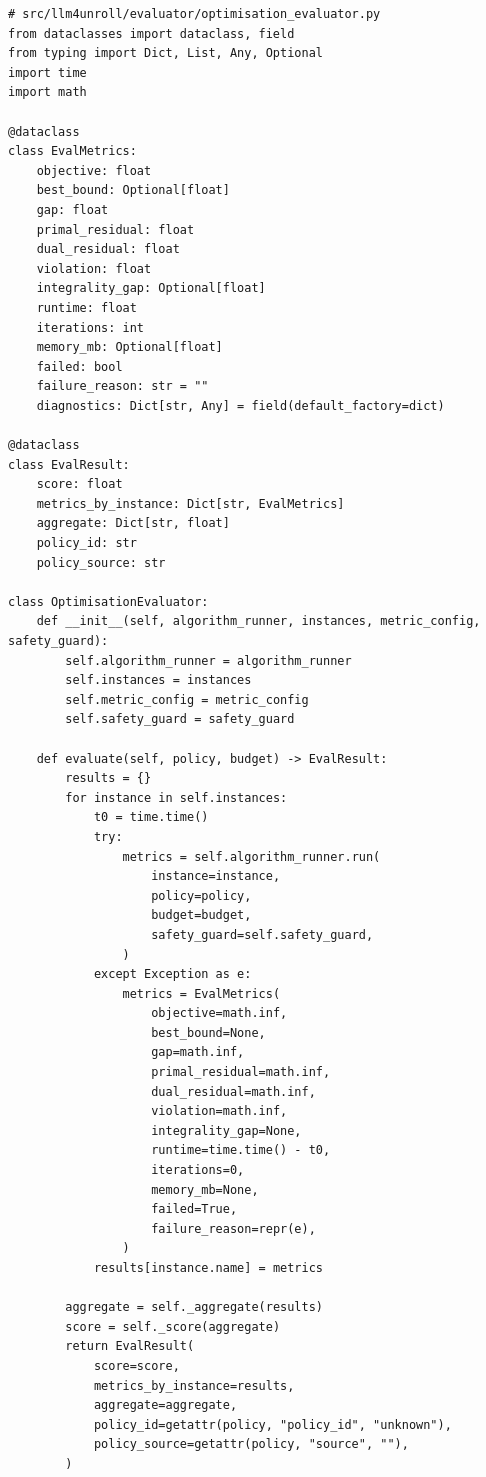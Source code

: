 \documentclass[12pt,a4paper]{ctexart}
\begin{document}
\begin{lstlisting}[style=pythonstyle]
# src/llm4unroll/evaluator/optimisation_evaluator.py
from dataclasses import dataclass, field
from typing import Dict, List, Any, Optional
import time
import math

@dataclass
class EvalMetrics:
    objective: float
    best_bound: Optional[float]
    gap: float
    primal_residual: float
    dual_residual: float
    violation: float
    integrality_gap: Optional[float]
    runtime: float
    iterations: int
    memory_mb: Optional[float]
    failed: bool
    failure_reason: str = ""
    diagnostics: Dict[str, Any] = field(default_factory=dict)

@dataclass
class EvalResult:
    score: float
    metrics_by_instance: Dict[str, EvalMetrics]
    aggregate: Dict[str, float]
    policy_id: str
    policy_source: str

class OptimisationEvaluator:
    def __init__(self, algorithm_runner, instances, metric_config, safety_guard):
        self.algorithm_runner = algorithm_runner
        self.instances = instances
        self.metric_config = metric_config
        self.safety_guard = safety_guard

    def evaluate(self, policy, budget) -> EvalResult:
        results = {}
        for instance in self.instances:
            t0 = time.time()
            try:
                metrics = self.algorithm_runner.run(
                    instance=instance,
                    policy=policy,
                    budget=budget,
                    safety_guard=self.safety_guard,
                )
            except Exception as e:
                metrics = EvalMetrics(
                    objective=math.inf,
                    best_bound=None,
                    gap=math.inf,
                    primal_residual=math.inf,
                    dual_residual=math.inf,
                    violation=math.inf,
                    integrality_gap=None,
                    runtime=time.time() - t0,
                    iterations=0,
                    memory_mb=None,
                    failed=True,
                    failure_reason=repr(e),
                )
            results[instance.name] = metrics

        aggregate = self._aggregate(results)
        score = self._score(aggregate)
        return EvalResult(
            score=score,
            metrics_by_instance=results,
            aggregate=aggregate,
            policy_id=getattr(policy, "policy_id", "unknown"),
            policy_source=getattr(policy, "source", ""),
        )


\end{lstlisting}
\end{document}
